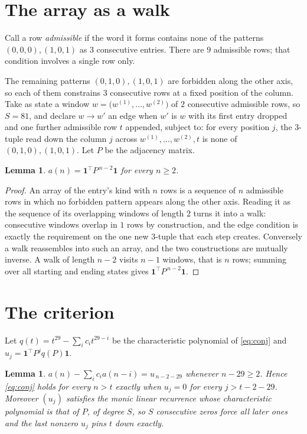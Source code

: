 \documentclass[11pt,a4paper]{article}
\theoremstyle{plain}
\newtheorem{lemma}[theorem]{Lemma}
\theoremstyle{definition}
\begin{document}
\section{The array as a walk}

Call a row \emph{admissible} if the word it forms contains none of the patterns
$(0,0,0), (1,0,1)$ as $3$ consecutive entries. There are $9$ admissible rows; that condition
involves a single row only.

The remaining patterns $(0,1,0), (1,0,1)$ are forbidden along the other axis, so each of them
constrains $3$ consecutive rows at a fixed position of the column. Take as state a
window $w=\bigl(w^{(1)},\dots,w^{(2)}\bigr)$ of $2$ consecutive admissible
rows, so $S=81$, and declare $w\to w'$ an edge when $w'$ is $w$ with its first entry
dropped and one further admissible row $t$ appended, subject to: for every position
$j$, the $3$-tuple read down the column $j$ across $w^{(1)},\dots,w^{(2)},t$
is none of $(0,1,0), (1,0,1)$. Let $P$ be the adjacency matrix.

\begin{lemma}\label{lem:walk}
$a(n)=\mathbf{1}^{\!\top}P^{\,n-2}\mathbf{1}$ for every $n\ge2$.
\end{lemma}

\begin{proof}
An array of the entry's kind with $n$ rows is a sequence of $n$ admissible rows in
which no forbidden pattern appears along the other axis. Reading it as the sequence of its
overlapping windows of length $2$ turns it into a walk: consecutive windows overlap in
$1$ rows by construction, and the edge condition is exactly the requirement on the one
new $3$-tuple that each step creates. Conversely a walk reassembles into such an array,
and the two constructions are mutually inverse. A walk of length $n-2$ visits $n-1$
windows, that is $n$ rows; summing over all starting and ending states gives
$\mathbf{1}^{\!\top}P^{\,n-2}\mathbf{1}$.
\end{proof}

\section{The criterion}

Let $q(t)=t^{29}-\sum_i c_i t^{29-i}$ be the characteristic polynomial of
\eqref{eq:conj} and $u_j=\mathbf{1}^{\!\top}P^{j}q(P)\mathbf{1}$.

\begin{lemma}\label{lem:crit}
$a(n)-\sum_i c_i a(n-i)=u_{\,n-2-29}$ whenever $n-29\ge2$. Hence
\eqref{eq:conj} holds for every $n>t$ exactly when $u_j=0$ for every
$j>t-2-29$. Moreover $(u_j)$ satisfies the monic linear recurrence whose
characteristic polynomial is that of $P$, of degree $S$, so $S$ consecutive zeros force all
later ones and the last nonzero $u_j$ pins $t$ down exactly.
\end{lemma}
\end{document}
